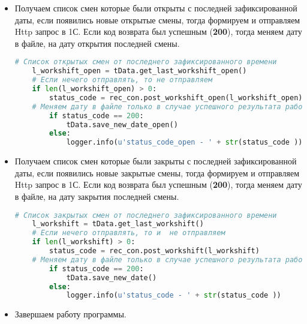 \begin{itemize}
\item Получаем список смен которые были открыты с последней зафиксированной даты, если появились новые открытые смены, тогда формируем и отправляем Http запрос в 1С. 
Если код возврата был успешным (\textbf{200}), тогда меняем дату в файле, на дату открытия последней смены.

\begin{tcolorbox}
	\begin{lstlisting}[language=Python,ndkeywordstyle=\color{darkgray}\bfseries,identifierstyle=\color{black},stringstyle=\color{red}\ttfamily,showstringspaces=false,keepspaces=true,extendedchars=\true]
 # Список открытых смен от последнего зафиксированного времени
	l_workshift_open = tData.get_last_workshift_open()
	# Если нечего отправлять, то не отправляем
	if len(l_workshift_open) > 0:
		status_code = rec_con.post_workshift_open(l_workshift_open)
	# Меняем дату в файле только в случае успешного результата работы 1C
		if status_code == 200:
			tData.save_new_date_open()
		else:
			logger.info(u'status_code_open - ' + str(status_code ))
	\end{lstlisting}
\end{tcolorbox}


\item Получаем список смен которые были закрыты с последней зафиксированной даты, если появились новые закрытые смены, тогда формируем и отправляем Http запрос в 1С. 
Если код возврата был успешным (\textbf{200}), тогда меняем дату в файле, на дату закрытия последней смены.

\begin{tcolorbox}
	\begin{lstlisting}[language=Python,ndkeywordstyle=\color{darkgray}\bfseries,identifierstyle=\color{black},stringstyle=\color{red}\ttfamily,showstringspaces=false,keepspaces=true,extendedchars=\true]
	# Список закрытых смен от последнего зафиксированного времени
	l_workshift = tData.get_last_workshift()
	# Если нечего отправлять, то и  не отправляем
	if len(l_workshift) > 0:
		status_code = rec_con.post_workshift(l_workshift)
	# Меняем дату в файле только в случае успешного результата работы 1С
		if status_code == 200:
			tData.save_new_date()
		else:
			logger.info(u'status_code - ' + str(status_code ))
	\end{lstlisting}
\end{tcolorbox}

\item Завершаем работу программы.

\end{itemize}